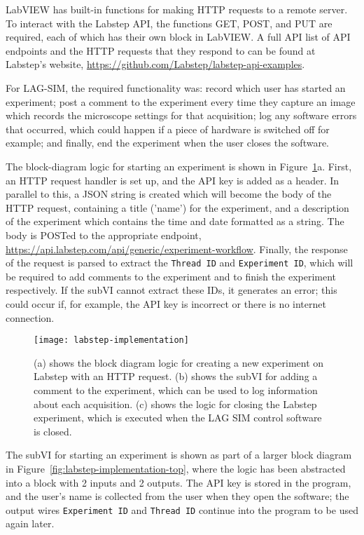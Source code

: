 LabVIEW has built-in functions for making HTTP requests to a remote server. 
To interact with the Labstep API, the functions GET, POST, and PUT are required, each of which has their own block in LabVIEW. 
A full API list of API endpoints and the HTTP requests that they respond to can be found at Labstep's website, \url{https://github.com/Labstep/labstep-api-examples}. 

For LAG-SIM, the required functionality was: record which user has started an experiment; post a comment to the experiment every time they capture an image which records the microscope settings for that acquisition; log any software errors that occurred, which could happen if a piece of hardware is switched off for example; and finally, end the experiment when the user closes the software. 

The block-diagram logic for starting an experiment is shown in Figure~\ref{fig:labstep-implementation}a. 
First, an HTTP request handler is set up, and the API key is added as a header. 
In parallel to this, a JSON string is created which will become the body of the HTTP request, containing a title ('name') for the experiment, and a description of the experiment which contains the time and date formatted as a string. 
The body is POSTed to the appropriate endpoint, \url{https://api.labstep.com/api/generic/experiment-workflow}. 
Finally, the response of the request is parsed to extract the \texttt{Thread ID} and \texttt{Experiment ID}, which will be required to add comments to the experiment and to finish the experiment respectively. 
If the subVI cannot extract these IDs, it generates an error; this could occur if, for example, the API key is incorrect or there is no internet connection. 

\begin{figure}[p]
\centering
\texttt{[image: labstep-implementation]}
\caption[SubVIs for uploading experiment information to Labstep]{(a) shows the block diagram logic for creating a new experiment on Labstep with an HTTP request. (b) shows the subVI for adding a comment to the experiment, which can be used to log information about each acquisition. (c) shows the logic for closing the Labstep experiment, which is executed when the LAG SIM control software is closed. }
\label{fig:labstep-implementation}
\end{figure}

The subVI for starting an experiment is shown as part of a larger block diagram in Figure~\ref{fig:labstep-implementation-top}, where the logic has been abstracted into a block with 2 inputs and 2 outputs. 
The API key is stored in the program, and the user's name is collected from the user when they open the software; the output wires \texttt{Experiment ID} and \texttt{Thread ID} continue into the program to be used again later. 


